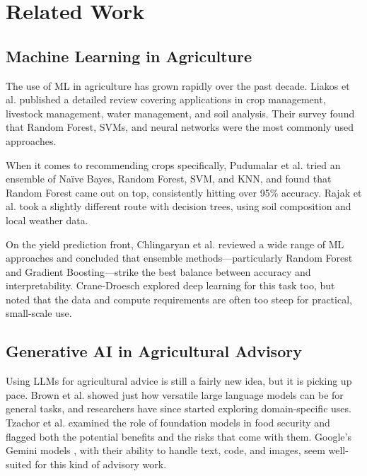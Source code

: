 \documentclass[conference]{IEEEtran}
\begin{document}
\section{Related Work}
\label{sec:related}

\subsection{Machine Learning in Agriculture}
The use of ML in agriculture has grown rapidly over the past decade. Liakos et al. \cite{liakos2018} published a detailed review covering applications in crop management, livestock management, water management, and soil analysis. Their survey found that Random Forest, SVMs, and neural networks were the most commonly used approaches.

When it comes to recommending crops specifically, Pudumalar et al. \cite{pudumalar2017} tried an ensemble of Na\"ive Bayes, Random Forest, SVM, and KNN, and found that Random Forest came out on top, consistently hitting over 95\% accuracy. Rajak et al. \cite{rajak2017} took a slightly different route with decision trees, using soil composition and local weather data.

On the yield prediction front, Chlingaryan et al. \cite{chlingaryan2018} reviewed a wide range of ML approaches and concluded that ensemble methods---particularly Random Forest and Gradient Boosting---strike the best balance between accuracy and interpretability. Crane-Droesch \cite{crane2018} explored deep learning for this task too, but noted that the data and compute requirements are often too steep for practical, small-scale use.

\subsection{Generative AI in Agricultural Advisory}
Using LLMs for agricultural advice is still a fairly new idea, but it is picking up pace. Brown et al. \cite{brown2020} showed just how versatile large language models can be for general tasks, and researchers have since started exploring domain-specific uses. Tzachor et al. \cite{tzachor2023} examined the role of foundation models in food security and flagged both the potential benefits and the risks that come with them. Google's Gemini models \cite{google2024gemini}, with their ability to handle text, code, and images, seem well-suited for this kind of advisory work.
\end{document}
